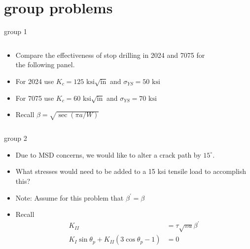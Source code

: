 \documentclass[10pt]{beamer}
\begin{document}
	\section{group problems}
	
	\begin{frame}{group 1}
		\begin{columns}
			\begin{column}{0.48\linewidth}
				\begin{itemize}
					\item Compare the effectiveness of stop drilling in 2024 and 7075 for the following panel.
					\item For 2024 use $K_c = 125 \text{ ksi}\sqrt{\text{in}}$ and $\sigma_{YS} = 50 \text{ ksi}$
					\item For 7075 use $K_c = 60 \text{ ksi}\sqrt{\text{in}}$ and $\sigma_{YS} = 70 \text{ ksi}$
					\item Recall $\beta = \sqrt{\sec(\pi a/W)}$
				\end{itemize}
			\end{column}
			
			\begin{column}{0.48\linewidth}
				\begin{figure}[H]
					\centering
				\end{figure}
			\end{column}
		\end{columns}
	\end{frame}
	
	\begin{frame}{group 2}
		\begin{itemize}
			\item Due to MSD concerns, we would like to alter a crack path by $15^\circ$.
			\item What stresses would need to be added to a 15 ksi tensile load to accomplish this? 
			\item Note: Assume for this problem that $\beta^\prime = \beta$
			\item Recall
			\begin{align*}
			K_{II} &= \tau \sqrt{\pi a}\beta^\prime\\
			K_I \sin \theta_p + K_{II}\left(3\cos \theta_p -1 \right) &= 0
			\end{align*}
		\end{itemize}
	\end{frame}
	
\end{document}
